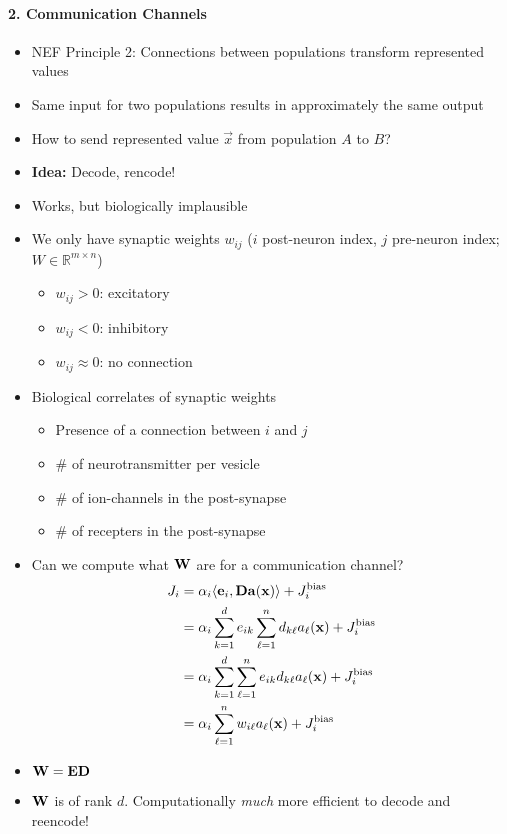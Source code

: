 \documentclass[10pt,letterpaper,oneside]{article}
\begin{document}
\paragraph{2. Communication Channels}
\begin{itemize}
	\item NEF Principle 2: Connections between populations transform represented values
	\item Same input for two populations results in approximately the same output
	\item How to send represented value $\vec x$ from population $A$ to $B$?
	\item \textbf{Idea:} Decode, rencode!
	\item Works, but biologically implausible
	\item We only have synaptic weights $w_{ij}$ ($i$ post-neuron index, $j$ pre-neuron index; $W \in \mathbb{R}^{m \times n}$)
	\begin{itemize}
		\item $w_{ij} > 0$: excitatory
		\item $w_{ij} < 0$: inhibitory
		\item $w_{ij} \approx 0$: no connection
	\end{itemize}
	\item Biological correlates of synaptic weights
	\begin{itemize}
		\item Presence of a connection between $i$ and $j$
		\item \# of neurotransmitter per vesicle
		\item \# of ion-channels in the post-synapse
		\item \# of recepters in the post-synapse
	\end{itemize}
	\item Can we compute what ${\mathbf{W}}$ are for a communication channel?
	\begin{align*}
		J_i &= \alpha_i \langle {\mathbf{e}}_i, {\mathbf{D}} {\mathbf{a}}({\mathbf{x}}) \rangle + J^\mathrm{bias}_i \\
		    &= \alpha_i \sum_{k=1}^d e_{ik} \sum_{\ell=1}^n d_{k\ell} a_\ell({\mathbf{x}}) + J^\mathrm{bias}_i \\
		    &= \alpha_i \sum_{k=1}^d \sum_{\ell=1}^n e_{ik}  d_{k\ell} a_\ell({\mathbf{x}}) + J^\mathrm{bias}_i \\
		    &= \alpha_i \sum_{\ell=1}^n w_{i\ell} a_\ell({\mathbf{x}}) + J^\mathrm{bias}_i
	\end{align*}
	\item ${\mathbf{W}} = {\mathbf{E}} {\mathbf{D}}$
	\item ${\mathbf{W}}$ is of rank $d$. Computationally \emph{much} more efficient to decode and reencode!
\end{itemize}
\end{document}
